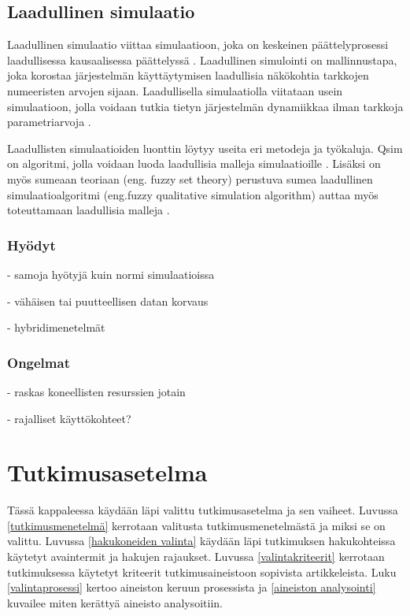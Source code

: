 \documentclass[utf8]{gradu3}
\begin{document}
\section{Laadullinen simulaatio} \label{laadullinen simulaatio}
Laadullinen simulaatio viittaa simulaatioon, joka on keskeinen päättelyprosessi laadullisessa kausaalisessa päättelyssä \parencite{kuipers1986qualitative}. Laadullinen simulointi on mallinnustapa, joka korostaa järjestelmän käyttäytymisen laadullisia näkökohtia tarkkojen numeeristen arvojen sijaan. Laadullisella simulaatiolla viitataan usein simulaatioon, jolla voidaan tutkia tietyn järjestelmän dynamiikkaa ilman tarkkoja parametriarvoja \parencite{cosme2023history}.

Laadullisten simulaatioiden luonttin löytyy useita eri metodeja ja työkaluja.
Qsim on algoritmi, jolla voidaan luoda laadullisia malleja simulaatioille \parencite{kuipers1986qualitative}. Lisäksi on myös sumeaan teoriaan (eng. fuzzy set theory) perustuva sumea laadullinen simulaatioalgoritmi (eng.fuzzy qualitative simulation algorithm) auttaa myös toteuttamaan laadullisia malleja \parencite{shen1993fuzzy}.

\subsection{Hyödyt}
- samoja hyötyjä kuin normi simulaatioissa

- vähäisen tai puutteellisen datan korvaus

- hybridimenetelmät \parencite{semiHybrid1997qualitative}

\subsection{Ongelmat}
- raskas koneellisten resurssien jotain

- rajalliset käyttökohteet?

\chapter{Tutkimusasetelma}
Tässä kappaleessa käydään läpi valittu tutkimusasetelma ja sen vaiheet. Luvussa \ref{tutkimusmenetelmä} kerrotaan valitusta tutkimusmenetelmästä ja miksi se on valittu. Luvussa \ref{hakukoneiden valinta} käydään läpi tutkimuksen hakukohteissa käytetyt avaintermit ja hakujen rajaukset. Luvussa \ref{valintakriteerit} kerrotaan tutkimuksessa käytetyt kriteerit tutkimusaineistoon sopivista artikkeleista. Luku \ref{valintaprosessi} kertoo aineiston keruun prosessista ja \ref{aineiston analysointi} kuvailee miten kerättyä aineisto analysoitiin.
\end{document}

